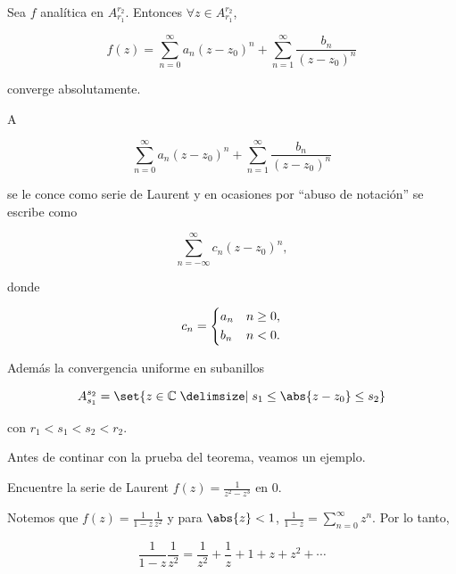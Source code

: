 \documentclass[../main.tex]{subfiles}
\begin{document}
\begin{theorem}[de Laurent]
    Sea \(f\) analítica en \(A_{r_{1}}^{r_{2}}\). Entonces \(\forall z\in
    A_{r_{1}}^{r_{2}}\),

    \begin{equation*}
        f(z) = \sum_{n = 0}^{\infty}a_{n}(z - z_{0})^{n} + \sum_{n =
        1}^{\infty}\dfrac{b_{n}}{(z - z_{0})^{n}}
    \end{equation*}

    converge absolutamente.

    A

    \begin{equation*}
        \sum_{n = 0}^{\infty}a_{n}(z - z_{0})^{n} + \sum_{n =
        1}^{\infty}\dfrac{b_{n}}{(z - z_{0})^{n}}
    \end{equation*}

    se le conce como serie de Laurent y en ocasiones por ``abuso de
    notación'' se escribe
    como

    \begin{equation*}
        \sum_{n = -\infty}^{\infty}c_{n}(z - z_{0})^{n},
    \end{equation*}

    donde

    \begin{equation*}
        c_{n} =
        \begin{dcases}
            a_{n} & n \geq 0,\\
            b_{n} & n < 0.
        \end{dcases}
    \end{equation*}

    Además la convergencia uniforme en subanillos

    \begin{equation*}
        A_{s_{1}}^{s_{2}} = \set{z\in \mathbb{C} \given s_{1} \leq \abs{z -
        z_{0}} \leq s_{2}}
    \end{equation*}

    con \(r_{1} < s_{1} < s_{2} < r_{2}\).
\end{theorem}

Antes de continar con la prueba del teorema, veamos un ejemplo.

\begin{example}
    Encuentre la serie de Laurent \(f(z) = \tfrac{1}{z^{2} - z^{3}}\) en \(0\).

    Notemos que \(f(z) = \tfrac{1}{1 - z}\tfrac{1}{z^{2}}\) y para \(\abs{z} < 1\),
    \(\tfrac{1}{1 - z} = \sum_{n = 0}^{\infty}z^{n}\). Por lo tanto,

    \begin{equation*}
        \dfrac{1}{1 - z}\dfrac{1}{z^{2}} = \dfrac{1}{z^{2}} + \dfrac{1}{z} +
        1 + z + z^{2} +
        \cdots
    \end{equation*}
\end{example}
\end{document}
